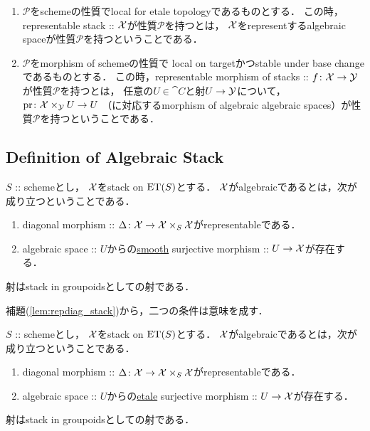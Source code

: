     \begin{Def}
        \enumfix
    \begin{enumerate}
    \item
        $\mathcal{P}$をschemeの性質でlocal for etale topologyであるものとする．
        この時，representable stack :: $\mathcal{X}$が性質$\mathcal{P}$を持つとは，
        $\mathcal{X}$をrepresentするalgebraic spaceが性質$\mathcal{P}$を持つということである．

    \item
        $\mathcal{P}$をmorphism of schemeの性質で
        local on targetかつstable under base changeであるものとする．
        この時，representable morphism of stacks :: $f \colon \mathcal{X} \to \mathcal{Y}$が性質$\mathcal{P}$を持つとは，
        任意の$U \in \cat{C}$と射$U \to \mathcal{Y}$について，
        $\operatorname{pr} \colon \mathcal{X} \times_{\mathcal{Y}} U \to U$
        （に対応するmorphism of algebraic algebraic spaces）が性質$\mathcal{P}$を持つということである．
    \end{enumerate}
    \end{Def}

    \subsection{Definition of Algebraic Stack}\label{sec:def-algst}
    \begin{Def}
        $S$ :: schemeとし，
        $\mathcal{X}$をstack on $\mathrm{ET}(S)$とする．
        $\mathcal{X}$がalgebraicであるとは，次が成り立つということである．
    \begin{enumerate}[label=(\alph*)]
        \item diagonal morphism :: $\Delta \colon \mathcal{X} \to \mathcal{X} \times_{S} \mathcal{X}$がrepresentableである．
        \item algebraic space :: $U$からの\underline{smooth} surjective morphism :: $U \to \mathcal{X}$が存在する．
    \end{enumerate}
        射はstack in groupoidsとしての射である．    
    \end{Def}
    補題(\ref{lem:repdiag_stack})から，二つの条件は意味を成す．

    \begin{Def}
        $S$ :: schemeとし，
        $\mathcal{X}$をstack on $\mathrm{ET}(S)$とする．
        $\mathcal{X}$がalgebraicであるとは，次が成り立つということである．
    \begin{enumerate}[label=(\alph*)]
        \item diagonal morphism :: $\Delta \colon \mathcal{X} \to \mathcal{X} \times_{S} \mathcal{X}$がrepresentableである．
        \item algebraic space :: $U$からの\underline{etale} surjective morphism :: $U \to \mathcal{X}$が存在する．
    \end{enumerate}
        射はstack in groupoidsとしての射である．    
    \end{Def}

